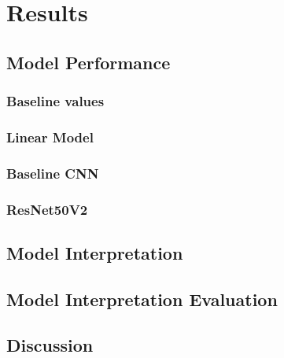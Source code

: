 \documentclass[biblatexBackend=bibtex]{tumthesis}
\begin{document}
\chapter{Results}
\label{ch:results}


\section{Model Performance}
\label{sec:model_performance}

\subsection{Baseline values}
\label{sec:results:bl_values}

\subsection{Linear Model}
\label{sec:results:lm}

\subsection{Baseline CNN}
\label{sec:results:bl_cnn}

\subsection{ResNet50V2}
\label{sec:results:RN50V2}

\section{Model Interpretation}
\label{sec:results:model_interpretation}

\section{Model Interpretation Evaluation}
\label{sec:results:model_inter_eval}

\section{Discussion}


\end{document}
